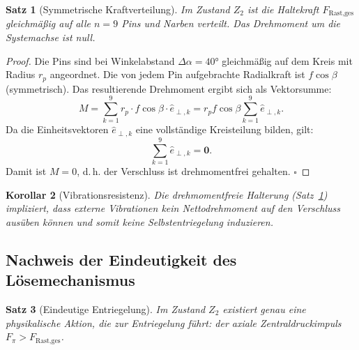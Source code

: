 ﻿\documentclass[12pt, a4paper]{article}
\newtheorem{theorem}{Satz}[section]
\newtheorem{corollary}[theorem]{Korollar}
\theoremstyle{remark}
\newcommand{\vvec}[1]{\boldsymbol{#1}}
\begin{document}
\begin{theorem}[Symmetrische Kraftverteilung]
  \label{thm:symmetrie}
  Im Zustand $Z_2$ ist die Haltekraft $F_{\text{Rast,ges}}$ gleichmäßig auf alle $n = 9$
  Pins und Narben verteilt. Das Drehmoment um die Systemachse ist null.
\end{theorem}

\begin{proof}
  Die Pins sind bei Winkelabstand $\Delta\alpha = 40 °$ gleichmäßig auf dem Kreis mit
  Radius $r_p$ angeordnet. Die von jedem Pin aufgebrachte Radialkraft ist $f \cos\beta$ (symmetrisch).
  Das resultierende Drehmoment ergibt sich als Vektorsumme:
  \[
    M = \sum_{k=1}^{9} r_p \cdot f\cos\beta \cdot \hat{e}_{\perp,k}
      = r_p f\cos\beta \sum_{k=1}^{9} \hat{e}_{\perp,k}.
  \]
  Da die Einheitsvektoren $\hat{e}_{\perp,k}$ eine vollständige Kreisteilung bilden, gilt:
  \[
    \sum_{k=1}^{9} \hat{e}_{\perp,k} = \vvec{0}.
  \]
  Damit ist $M = 0$, d.\,h. der Verschluss ist drehmomentfrei gehalten. $\square$
\end{proof}

\begin{corollary}[Vibrationsresistenz]
  Die drehmomentfreie Halterung (Satz~\ref{thm:symmetrie}) impliziert, dass externe
  Vibrationen kein Nettodrehmoment auf den Verschluss ausüben können und somit keine
  Selbstentriegelung induzieren.
\end{corollary}

\subsection{Nachweis der Eindeutigkeit des Lösemechanismus}

\begin{theorem}[Eindeutige Entriegelung]
  \label{thm:einheit}
  Im Zustand $Z_2$ existiert genau eine physikalische Aktion, die zur Entriegelung führt:
  der axiale Zentraldruckimpuls $F_\pi > F_{\text{Rast,ges}}$.
\end{theorem}
\end{document}
